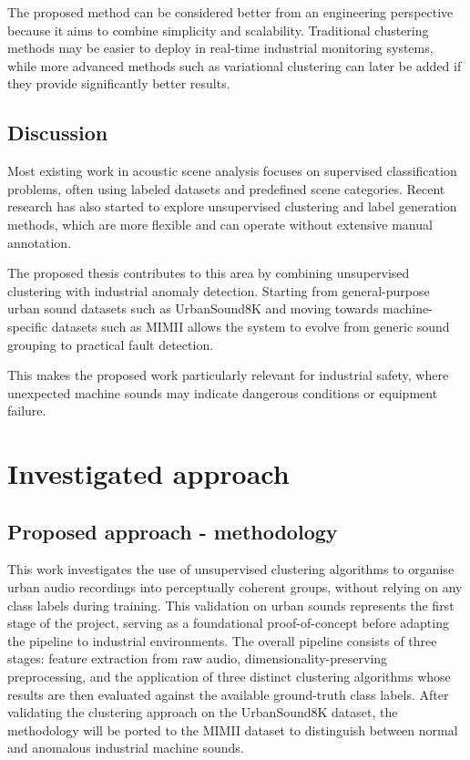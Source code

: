 \documentclass[runningheads,a4paper,11pt]{report}
\begin{document}
The proposed method can be considered better from an engineering perspective because it aims to combine simplicity and scalability. Traditional clustering methods may be easier to deploy in real-time industrial monitoring systems, while more advanced methods such as variational clustering can later be added if they provide significantly better results.

\section{Discussion}

Most existing work in acoustic scene analysis focuses on supervised classification problems, often using labeled datasets and predefined scene categories. Recent research has also started to explore unsupervised clustering and label generation methods, which are more flexible and can operate without extensive manual annotation.

The proposed thesis contributes to this area by combining unsupervised clustering with industrial anomaly detection. Starting from general-purpose urban sound datasets such as UrbanSound8K and moving towards machine-specific datasets such as MIMII allows the system to evolve from generic sound grouping to practical fault detection.

This makes the proposed work particularly relevant for industrial safety, where unexpected machine sounds may indicate dangerous conditions or equipment failure.



\chapter{Investigated approach}
\label{chapter:proposedApproach}

\section{Proposed approach - methodology}
\label{section:ProposedApproach}

This work investigates the use of unsupervised clustering algorithms to organise urban audio recordings into perceptually coherent groups, without relying on any class labels during training. This validation on urban sounds represents the first stage of the project, serving as a foundational proof-of-concept before adapting the pipeline to industrial environments. The overall pipeline consists of three stages: feature extraction from raw audio, dimensionality-preserving preprocessing, and the application of three distinct clustering algorithms whose results are then evaluated against the available ground-truth class labels. After validating the clustering approach on the UrbanSound8K dataset, the methodology will be ported to the MIMII dataset to distinguish between normal and anomalous industrial machine sounds.
\end{document}
